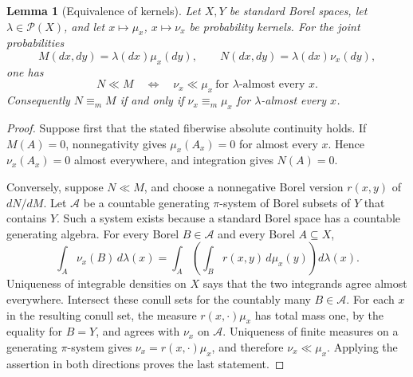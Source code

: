 \documentclass[11pt]{article}
\newtheorem{lemma}[theorem]{Lemma}
\theoremstyle{definition}
\newcommand{\Prob}{\mathcal P}
\newcommand{\ME}{\mathrel{\equiv_m}}
\begin{document}
\begin{lemma}[Equivalence of kernels]\label{lem:fibers}
Let $X,Y$ be standard Borel spaces, let $\lambda\in\Prob(X)$, and let
$x\mapsto\mu_x$, $x\mapsto\nu_x$ be probability kernels. For the joint
probabilities
\[
 M(dx,dy)=\lambda(dx)\mu_x(dy),\qquad
 N(dx,dy)=\lambda(dx)\nu_x(dy),
\]
one has
\[
 N\ll M\quad\Longleftrightarrow\quad
 \nu_x\ll\mu_x\ \text{for $\lambda$-almost every $x$}.
\]
Consequently $N\ME M$ if and only if
$\nu_x\ME\mu_x$ for $\lambda$-almost every $x$.
\end{lemma}
\begin{proof}
Suppose first that the stated fiberwise absolute continuity holds. If
$M(A)=0$, nonnegativity gives $\mu_x(A_x)=0$ for almost every $x$.
Hence $\nu_x(A_x)=0$ almost everywhere, and integration gives $N(A)=0$.

Conversely, suppose $N\ll M$, and choose a nonnegative Borel version
$r(x,y)$ of $dN/dM$. Let $\mathcal A$ be a countable generating
$\pi$-system of Borel subsets of $Y$ that contains $Y$. Such a system
exists because a standard Borel space has a countable generating algebra.
For every Borel $B\in\mathcal A$ and every Borel $A\subseteq X$,
\[
 \int_A\nu_x(B)\,d\lambda(x)
 =\int_A\left(\int_B r(x,y)\,d\mu_x(y)\right)d\lambda(x).
\]
Uniqueness of integrable densities on $X$ says that the two integrands
agree almost everywhere. Intersect these conull sets for the countably
many $B\in\mathcal A$. For each $x$ in the resulting conull set,
the measure $r(x,\cdot)\mu_x$ has total mass one, by the equality for
$B=Y$, and agrees with $\nu_x$ on $\mathcal A$. Uniqueness of finite
measures on a generating $\pi$-system gives
$\nu_x=r(x,\cdot)\mu_x$, and therefore $\nu_x\ll\mu_x$.
Applying the assertion in both directions proves the last statement.
\end{proof}
\end{document}
